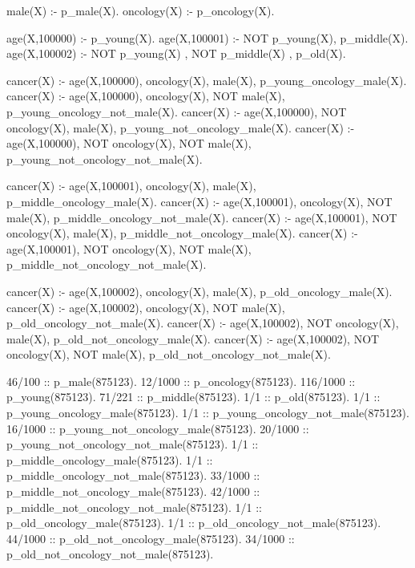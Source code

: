 \documentclass[german,version-2020-11]{uzl-thesis}
\begin{document}
\newpage
\begin{Pseudocode} [caption={\textit{beliefProgram.pbl} für Krebs in eICU}, label={code:beliefprogrameicu}, numbers=left]
male(X) :- p_male(X). 
oncology(X) :- p_oncology(X).

age(X,100000) :- p_young(X).
age(X,100001) :- NOT p_young(X), p_middle(X).
age(X,100002) :- NOT p_young(X) , NOT p_middle(X) , p_old(X).

cancer(X) :- age(X,100000), oncology(X), male(X), p_young_oncology_male(X).
cancer(X) :- age(X,100000), oncology(X), NOT male(X), p_young_oncology_not_male(X).
cancer(X) :- age(X,100000), NOT oncology(X), male(X), p_young_not_oncology_male(X).
cancer(X) :- age(X,100000), NOT oncology(X), NOT male(X), p_young_not_oncology_not_male(X).

cancer(X) :- age(X,100001), oncology(X), male(X), p_middle_oncology_male(X).
cancer(X) :- age(X,100001), oncology(X), NOT male(X), p_middle_oncology_not_male(X).
cancer(X) :- age(X,100001), NOT oncology(X), male(X), p_middle_not_oncology_male(X).
cancer(X) :- age(X,100001), NOT oncology(X), NOT male(X), p_middle_not_oncology_not_male(X).

cancer(X) :- age(X,100002), oncology(X), male(X), p_old_oncology_male(X).
cancer(X) :- age(X,100002), oncology(X), NOT male(X), p_old_oncology_not_male(X).
cancer(X) :- age(X,100002), NOT oncology(X), male(X), p_old_not_oncology_male(X).
cancer(X) :- age(X,100002), NOT oncology(X), NOT male(X), p_old_not_oncology_not_male(X).

46/100 :: p_male(875123).
12/1000 :: p_oncology(875123).
116/1000 :: p_young(875123).
71/221 :: p_middle(875123).
1/1 :: p_old(875123).
1/1 :: p_young_oncology_male(875123).
1/1 :: p_young_oncology_not_male(875123).
16/1000 :: p_young_not_oncology_male(875123).
20/1000 :: p_young_not_oncology_not_male(875123).
1/1 :: p_middle_oncology_male(875123).
1/1 :: p_middle_oncology_not_male(875123).
33/1000 :: p_middle_not_oncology_male(875123).
42/1000 :: p_middle_not_oncology_not_male(875123).
1/1 :: p_old_oncology_male(875123).
1/1 :: p_old_oncology_not_male(875123).
44/1000 :: p_old_not_oncology_male(875123).
34/1000 :: p_old_not_oncology_not_male(875123).
\end{Pseudocode}
\end{document}
